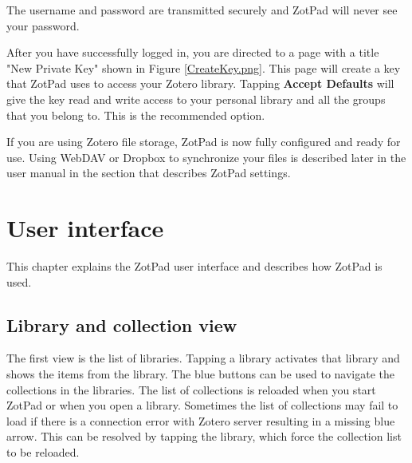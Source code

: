 \documentclass[oneside, openany, 12pt]{tufte-book}
\newcommand{\iphone}[1]{#1}
\newcommand{\ipad}[1]{}
\newcommand{\image}[2]{
	\center
	\fbox{\texttt{[image: images/iPhone/\{\#2]}}}

	\caption{#1 \label{#2}}
	\smallskip\noindent\small Figure \ref{#2}: #1
	}
\newcommand{\iphone}[1]{}
\newcommand{\ipad}[1]{#1}
\newcommand{\image}[2]{
	\caption{#1}
	\label{#2}
	\fbox{\texttt{[image: images/iPad/\{\#2]}}}
	}
\begin{document}
\begin{figure}
\image{Log in to Zotero}{Login.png}
\end{figure}

The username and password are transmitted securely and ZotPad will never see your password. 

\clearpage

\begin{figure}
\image{Create access key}{CreateKey.png}
\end{figure}

After you have successfully logged in, you are directed to a page with a title "New Private Key" shown in Figure \ref{CreateKey.png}. This page will create a key that ZotPad uses to access your Zotero library. Tapping  \textbf{Accept Defaults} will give the key read and write access to your personal library and all the groups that you belong to. This is the recommended option. 

If you are using Zotero file storage, ZotPad is now fully configured and ready for use. Using WebDAV or Dropbox to synchronize your files is described later in the user manual in the section that describes ZotPad settings.

\chapter{User interface}

This chapter explains the ZotPad user interface and describes how ZotPad is used.

\section{Library and collection view}

\ipad{ZotPad is designed to be used mainly in the landscape orientation. The main screen that is shown in Figure \ref{ItemList.png} consists of the navigator on the left and the content view on the right. In the portrait mode, the navigator is hidden, but can be shown by tapping a button on the top left corner of the content view. 

\begin{figure}
\image{Main user interface}{ItemList.png}
\end{figure}

Initially the navigator displays the list of libraries that you have access to.} \iphone{The first view is the list of libraries. } Tapping a library activates that library and shows the items from the library\ipad{ as a list in the content view}. The blue buttons can be used to navigate the collections in the libraries. The list of collections is reloaded when you start ZotPad or when you open a library. Sometimes the list of collections may fail to load if there is a connection error with Zotero server resulting in a missing blue arrow. This can be resolved by tapping the library, which force the collection list to be reloaded.
\end{document}
